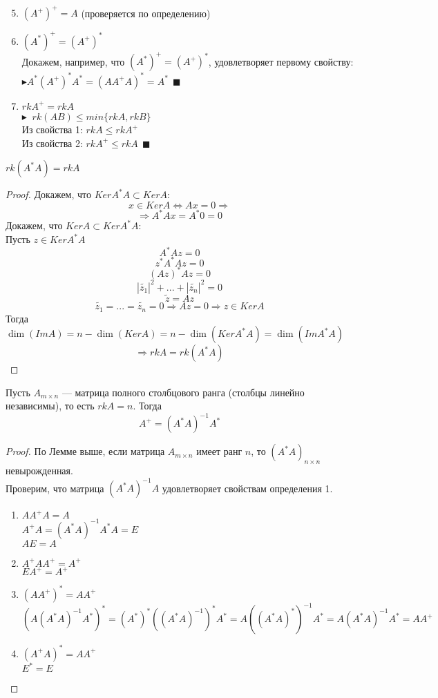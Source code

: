 \begin{lemma}
    \ 
\begin{enumerate}
    \setcounter{enumi}{4}
    \item $(A^+)^+=A$ (проверяется по определению)
    \item $(A^*)^+=(A^+)^*$\\
    Докажем, например, что $(A^*)^+=(A^+)^*$, удовлетворяет первому свойству:\\
    $\blacktriangleright A^*(A^+)^*A^*=(AA^+A)^*=A^* ~~\blacksquare$
    \item $rkA^+=rkA$\\
    $\blacktriangleright$ $~rk(AB) \leqslant min\{rkA, rkB\}$\\
    Из свойства 1: $rkA \leqslant rkA^+$\\
    Из свойства 2: $rkA^+ \leqslant rkA ~~\blacksquare$
\end{enumerate}
\end{lemma}
\begin{lemma}
    $rk(A^*A)=rkA$
\end{lemma}
\begin{proof}
    Докажем, что $Ker A^*A\subset Ker A$:
    $$x\in Ker A \Leftrightarrow Ax=0\Rightarrow$$
    $$\Rightarrow A^*Ax=A^* {0}=0$$
    Докажем, что $Ker A\subset Ker A^*A$:\\
    Пусть $z\in Ker A^*A$\\
    $$A^*Az=0$$
    $$z^*A^*Az=0$$
    $$(Az)^*Az=0$$
    $$|\tilde{z_1}|^2+...+|\tilde{z_n}|^2=0$$
    $$\tilde{z}=Az$$
    $$\tilde{z_1}=...=\tilde{z_n}=0 \Rightarrow Az=0 \Rightarrow z\in Ker A$$
    Тогда $\dim(Im A)= n - \dim(Ker A) = n - \dim(Ker A^*A) =\dim(Im A^*A)$\\
    $$\Rightarrow rk A = rk (A^*A) $$
\end{proof}
\begin{theorem}
    Пусть $A_{m \times n}$ --- матрица полного столбцового ранга (столбцы линейно независимы), то есть $rkA=n$. Тогда $$A^+=(A^*A)^{-1}A^*$$
\end{theorem}
\begin{proof}
    По Лемме выше, если матрица $A_{m\times n}$ имеет ранг $n$, то $(A^*A)_{n\times n}$ невырожденная.\\
Проверим, что матрица $(A^*A)^{-1}A$ удовлетворяет свойствам определения 1.
\begin{enumerate}
    \item $AA^+A=A$\\
    $A^+A=(A^*A)^{-1}A^*A=E$\\
    $AE=A$
    \item $A^+AA^+=A^+$\\
    $EA^+=A^+$
    \item $(AA^+)^*=AA^+$\\
    $(A(A^*A)^{-1}A^*)^*=(A^*)^*((A^*A)^{-1})^*A^*=A((A^*A)^*)^{-1}A^*=A(A^*A)^{-1}A^*=AA^+$
    \item $(A^+A)^*=AA^+$\\
    $E^*=E $
\end{enumerate}
\end{proof}
